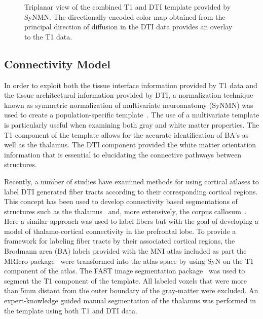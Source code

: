 \begin{figure}
\caption{Triplanar view of the combined T1 and DTI template provided by SyNMN. The directionally-encoded color map obtained from the principal direction of diffusion in the DTI data provides an overlay to the T1 data.}
\label{fig:atlas}
\end{figure}

\subsection{Connectivity Model}
In order to exploit both the tissue interface information provided by T1 data and the tissue architectural information provided by DTI, a normalization technique known as symmetric normalization of multivariate neuroanatomy (SyNMN) was used to create a population-specific template~\cite{Avants2007}. The use of a multivariate template is particularly useful when examining both gray and white matter properties. The T1 component of the template allows for the accurate identification of BA's as well as the thalamus. The DTI component provided the white matter orientation information that is essential to elucidating the connective pathways between structures. 

Recently, a number of studies have examined methods for using cortical atlases to label DTI generated fiber tracts according to their corresponding cortical regions. This concept has been used to develop connectivity based segmentations of structures such as the thalamus~\cite{Behrens03} and, more extensively, the corpus callosum~\cite{Styner05,Huang05,Hofer06}. Here a similar approach was used to label fibers but with the goal of developing a model of thalamo-cortical connectivity in the prefrontal lobe. To provide a framework for labeling fiber tracts by their associated cortical regions, the Brodmann area (BA) labels provided with the MNI atlas included as part the MRIcro package~\cite{mricro} were transformed into the atlas space by using SyN on the T1 component of the atlas. The FAST image segmentation package~\cite{Zhang01} was used to segment the T1 component of the template. All labeled voxels that were more than 5mm distant from the outer boundary of the gray-matter were excluded. An expert-knowledge guided manual segmentation of the thalamus was performed in the template using both T1 and DTI data. 
 
